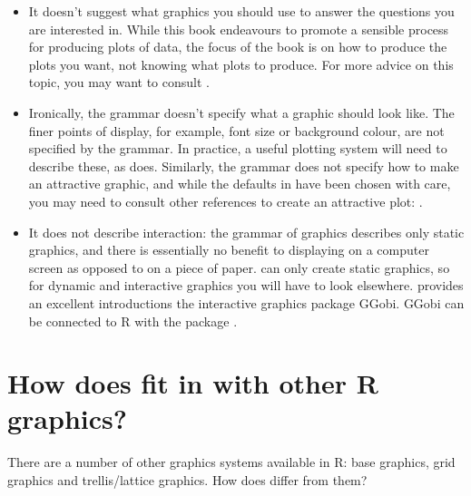 \begin{itemize}
  \item It doesn't suggest what graphics you should use to answer the questions you are interested in.  While this book endeavours to promote a sensible process for producing plots of data, the focus of the book is on how to produce the plots you want, not knowing what plots to produce. For more advice on this topic, you may want to consult  \citet{robbins:2004,cleveland:1993,chambers:1983,tukey:1977}.

  \item Ironically, the grammar doesn't specify what a graphic should look like.  The finer points of display, for example, font size or background colour, are not specified by the grammar.  In practice, a useful plotting system will need to describe these, as \ggplot does. Similarly, the grammar does not specify how to make an attractive graphic, and while the defaults in \ggplot have been chosen with care, you may need to consult other references to create an attractive plot: \citet{tufte:1990,tufte:1997,tufte:2001,tufte:2006}.

  \item It does not describe interaction: the grammar of graphics describes only static graphics, and there is essentially no benefit to displaying on a computer screen as opposed to on a piece of paper.  \ggplot can only create static graphics, so for dynamic and interactive graphics you will have to look elsewhere.  \citet{cook:2007} provides an excellent introductions the interactive graphics package GGobi.  GGobi can be connected to R with the  package \citep{wickham:2007i}.

\end{itemize}

\section{How does \ggplot fit in with other R graphics?}

There are a number of other graphics systems available in R: base graphics, grid graphics and trellis/lattice graphics.  How does \ggplot differ from them?

